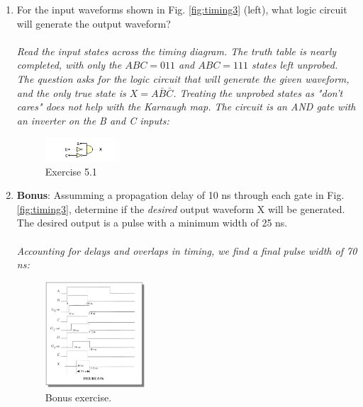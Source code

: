 \documentclass[10pt]{article}
\begin{document}
\begin{enumerate}
\item For the input waveforms shown in Fig. \ref{fig:timing3} (left), what logic circuit will generate the output waveform? \\ \\
\textit{Read the input states across the timing diagram.  The truth table is nearly completed, with only the $ABC = 011$ and $ABC = 111$ states left unprobed.  The question asks for the logic circuit that will generate the given waveform, and the only true state is $X = A\bar{B}\bar{C}$.  Treating the unprobed states as "don't cares" does not help with the Karnaugh map.  The circuit is an AND gate with an inverter on the B and C inputs:}
\begin{figure}[hb]
\centering
\includegraphics[width=0.25\textwidth]{gates_2.png}
\caption{Exercise 5.1}
\end{figure}
\item \textbf{Bonus}: Assumming a propagation delay of 10 ns through each gate in Fig. \ref{fig:timing3}, determine if the \textit{desired} output waveform X will be generated.  The desired output is a pulse with a minimum width of 25 ns. \\ \\
\textit{Accounting for delays and overlaps in timing, we find a final pulse width of 70 ns:}
\begin{figure}
\centering
\includegraphics[width=0.35\textwidth]{timing_bonus.png}
\caption{Bonus exercise.}
\end{figure}
\end{enumerate}
\end{document}
